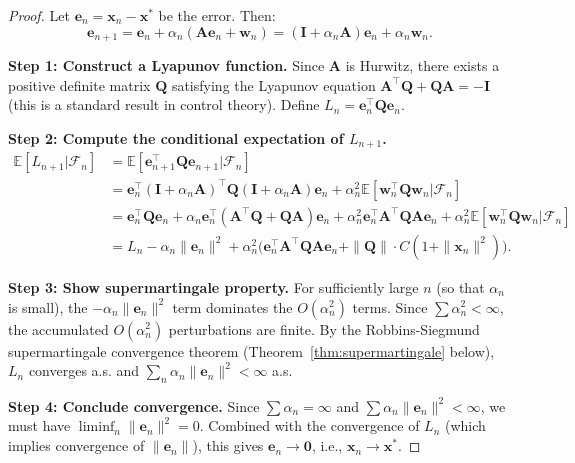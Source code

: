 \documentclass[11pt,a4paper]{article}
\theoremstyle{definition}
\theoremstyle{plain}
\theoremstyle{remark}
\newcommand{\E}{\mathbb{E}}
\begin{document}
\begin{proof}
Let $\bm{e}_n = \bm{x}_n - \bm{x}^*$ be the error. Then:
\begin{equation}
    \bm{e}_{n+1} = \bm{e}_n + \alpha_n(\bm{A}\bm{e}_n + \bm{w}_n) = (\bm{I} + \alpha_n \bm{A})\bm{e}_n + \alpha_n \bm{w}_n.
    \label{eq:error_recursion}
\end{equation}

\textbf{Step 1: Construct a Lyapunov function.} Since $\bm{A}$ is Hurwitz, there exists a positive definite matrix $\bm{Q}$ satisfying the Lyapunov equation $\bm{A}^\top \bm{Q} + \bm{Q}\bm{A} = -\bm{I}$ (this is a standard result in control theory). Define $L_n = \bm{e}_n^\top \bm{Q}\bm{e}_n$.

\textbf{Step 2: Compute the conditional expectation of $L_{n+1}$.}
\begin{align}
    \E[L_{n+1} | \mathcal{F}_n]
    &= \E[\bm{e}_{n+1}^\top \bm{Q}\bm{e}_{n+1} | \mathcal{F}_n] \nonumber\\
    &= \bm{e}_n^\top(\bm{I}+\alpha_n\bm{A})^\top\bm{Q}(\bm{I}+\alpha_n\bm{A})\bm{e}_n + \alpha_n^2 \E[\bm{w}_n^\top\bm{Q}\bm{w}_n | \mathcal{F}_n] \nonumber\\
    &= \bm{e}_n^\top\bm{Q}\bm{e}_n + \alpha_n\bm{e}_n^\top(\bm{A}^\top\bm{Q}+\bm{Q}\bm{A})\bm{e}_n + \alpha_n^2\bm{e}_n^\top\bm{A}^\top\bm{Q}\bm{A}\bm{e}_n + \alpha_n^2\E[\bm{w}_n^\top\bm{Q}\bm{w}_n|\mathcal{F}_n] \nonumber\\
    &= L_n - \alpha_n\|\bm{e}_n\|^2 + \alpha_n^2\bigl(\bm{e}_n^\top\bm{A}^\top\bm{Q}\bm{A}\bm{e}_n + \|\bm{Q}\|\cdot C(1+\|\bm{x}_n\|^2)\bigr). \label{eq:lyapunov_update}
\end{align}

\textbf{Step 3: Show supermartingale property.} For sufficiently large $n$ (so that $\alpha_n$ is small), the $-\alpha_n\|\bm{e}_n\|^2$ term dominates the $O(\alpha_n^2)$ terms. Since $\sum \alpha_n^2 < \infty$, the accumulated $O(\alpha_n^2)$ perturbations are finite. By the Robbins-Siegmund supermartingale convergence theorem (Theorem~\ref{thm:supermartingale} below), $L_n$ converges a.s. and $\sum_n \alpha_n \|\bm{e}_n\|^2 < \infty$ a.s.

\textbf{Step 4: Conclude convergence.} Since $\sum \alpha_n = \infty$ and $\sum \alpha_n\|\bm{e}_n\|^2 < \infty$, we must have $\liminf_n \|\bm{e}_n\|^2 = 0$. Combined with the convergence of $L_n$ (which implies convergence of $\|\bm{e}_n\|$), this gives $\bm{e}_n \to \bm{0}$, i.e., $\bm{x}_n \to \bm{x}^*$.
\end{proof}
\end{document}
